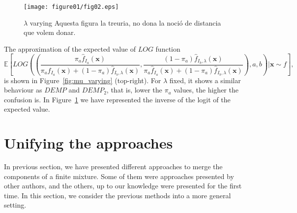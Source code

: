 \documentclass[10pt, a4paper]{article}
\newcommand{\m}[1]{\boldsymbol{#1}}
\begin{document}
\begin{figure}[!h]
\centering
\texttt{[image: figure01/fig02.eps]}
\caption{$\lambda$ varying {\color{red} Aquesta figura la treuria, no dona la noció de distancia que volem donar.}}
\label{fig:mu_varying_logit}
\end{figure}

The approximation of the expected value of $LOG$ function
\[
\mathbb{E}\left[LOG \left(
 \left( 
 \frac{\pi_a \hat{f}_{I_a}(\m x)}{\pi_a \hat{f}_{I_a}(\m x) + (1-\pi_a) \hat{f}_{I_b, \lambda}(\m x)}, 
 \frac{(1-\pi_a) \hat{f}_{I_b, \lambda}(\m x)}{\pi_a \hat{f}_{I_a}(\m x) + (1-\pi_a) \hat{f}_{I_b, \lambda}(\m x)} \right), a, b\right) | \m x \sim f \right],
\]
is shown in Figure~\ref{fig:mu_varying} (top-right). For $\lambda$ fixed, it shows a similar behaviour as $DEMP$ and $DEMP_2$, that is, lower the $\pi_a$ values, the higher the confusion is. In Figure~\ref{fig:mu_varying_logit} we have represented the inverse of the logit of the expected value.



%
%
%
%

\section{Unifying the approaches}
\label{confusion}

In previous section, we have presented different approaches to merge the components of a finite mixture. Some of them were approaches presented by other authors, and the others, up to our knowledge were presented for the first time. In this section, we consider the previous methods into a more general setting.
\end{document}
